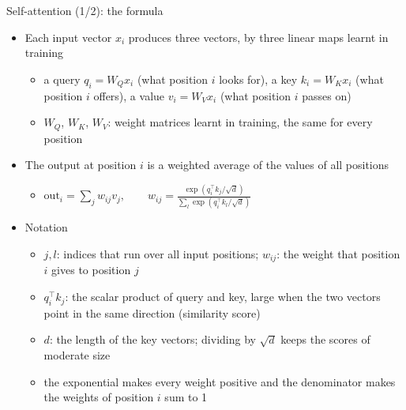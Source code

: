 \begin{frame}{Self-attention (1/2): the formula}
\itemsize{\footnotesize}
\begin{itemize}
    \item Each input vector $x_i$ produces three vectors, by three linear maps learnt in training
    \begin{itemize}
        \item a query $q_i = W_Q x_i$ (what position $i$ looks for), a key $k_i = W_K x_i$ (what position $i$ offers), a value $v_i = W_V x_i$ (what position $i$ passes on)
        \item $W_Q$, $W_K$, $W_V$: weight matrices learnt in training, the same for every position
    \end{itemize}
    \item The output at position $i$ is a weighted average of the values of all positions
    \begin{itemize}
        \item $\displaystyle \text{out}_i = \sum_j w_{ij} v_j, \qquad w_{ij} = \frac{\exp(q_i^\top k_j/\sqrt{d})}{\sum_l \exp(q_i^\top k_l/\sqrt{d})}$
    \end{itemize}
    \item Notation
    \begin{itemize}
        \item $j, l$: indices that run over all input positions; $w_{ij}$: the weight that position $i$ gives to position $j$
        \item $q_i^\top k_j$: the scalar product of query and key, large when the two vectors point in the same direction (similarity score)
        \item $d$: the length of the key vectors; dividing by $\sqrt{d}$ keeps the scores of moderate size
        \item the exponential makes every weight positive and the denominator makes the weights of position $i$ sum to 1
    \end{itemize}
\end{itemize}
\end{frame}

